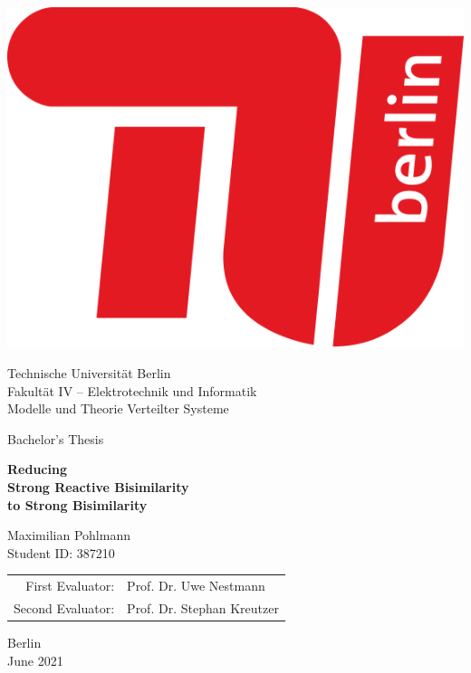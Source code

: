 \begin{titlepage}
\begin{center}
    \includegraphics[scale=.2]{TU}

    \vspace{3.5em}

    {\sc\large 
        {\LARGE Technische Universität Berlin}\\
        {Fakultät IV --  Elektrotechnik und Informatik}\\
        {Modelle und Theorie Verteilter Systeme}

        \vspace{4em}

        {Bachelor's Thesis}

        \vspace{1.5em}

        {\huge\upshape\bf Reducing\\[.1em] 
        Strong Reactive Bisimilarity\\[.25em]
        to Strong Bisimilarity}

        \vspace{3em}

        {\Large Maximilian Pohlmann}\\
        {Student ID: 387210}

        \vfill

        {\normalsize
            \begin{tabular}{r l}
                First Evaluator: & Prof. Dr. Uwe Nestmann \\
                Second Evaluator: & Prof. Dr. Stephan Kreutzer
            \end{tabular}
        }

        \vspace{3em}

        Berlin\\
        June 2021
    }
\end{center}
\end{titlepage}
\restoregeometry